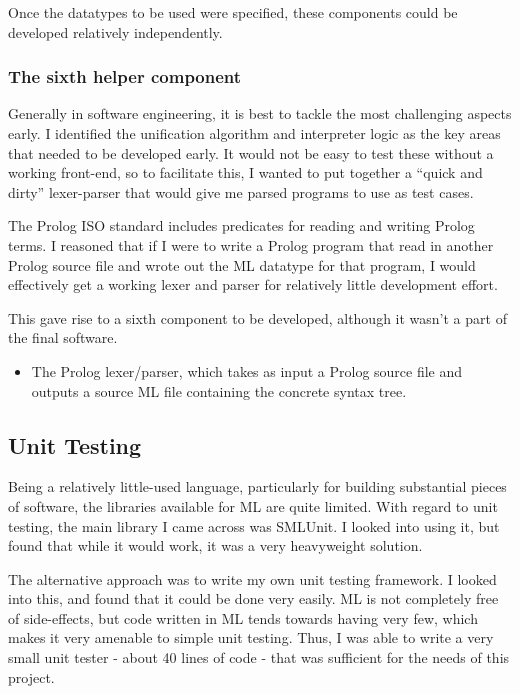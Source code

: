 \documentclass[12pt]{article}
\begin{document}
Once the datatypes to be used were specified, these components could be developed relatively independently.

\subsubsection{The sixth helper component}

Generally in software engineering, it is best to tackle the most challenging aspects early. 
I identified the unification algorithm and interpreter logic as the key areas that needed to be developed early. 
It would not be easy to test these without a working front-end, so to facilitate this, I wanted to put together a ``quick and dirty'' lexer-parser that would give me parsed programs to use as test cases.

The Prolog ISO standard includes predicates for reading and writing Prolog terms. 
I reasoned that if I were to write a Prolog program that read in another Prolog source file and wrote out the ML datatype for that program, I would effectively get a working lexer and parser for relatively little development effort. 

This gave rise to a sixth component to be developed, although it wasn't a part of the final software.

\begin{itemize}
\item The Prolog lexer/parser, which takes as input a Prolog source file and outputs a source ML file containing the concrete syntax tree.
\end{itemize}

\subsection{Unit Testing}

Being a relatively little-used language, particularly for building substantial pieces of software, the libraries available for ML are quite limited. 
With regard to unit testing, the main library I came across was SMLUnit. 
I looked into using it, but found that while it would work, it was a very heavyweight solution.

The alternative approach was to write my own unit testing framework. 
I looked into this, and found that it could be done very easily. 
ML is not completely free of side-effects, but code written in ML tends towards having very few, which makes it very amenable to simple unit testing. 
Thus, I was able to write a very small unit tester - about 40 lines of code - that was sufficient for the needs of this project.
\end{document}
